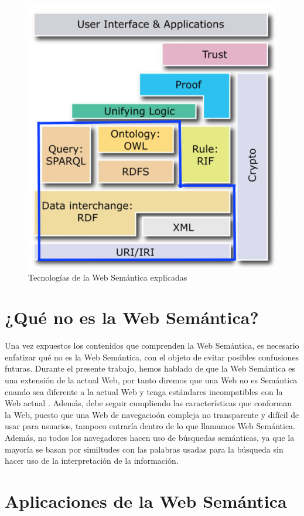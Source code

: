 \begin{figure}[H]
	\centering
	\includegraphics[width=0.48\linewidth]{imagenes/capitulo3/arquitectura2copia}
	\caption{Tecnologías de la Web Semántica explicadas}
	\label{fig:arquitectura2copia}
\end{figure}

\section{¿Qué no es la Web Semántica?}

Una vez expuestos los contenidos que comprenden la Web Semántica, es necesario enfatizar qué no es la Web Semántica, con el objeto de evitar posibles confusiones futuras. Durante el presente trabajo, hemos hablado de que la Web Semántica es una extensión de la actual Web, por tanto diremos que una Web no es Semántica cuando sea diferente a la actual Web y tenga estándares incompatibles con la Web actual \cite{introduccion}. Además, debe seguir cumpliendo las características que conforman la Web, puesto que una Web de navegacioón compleja no transparente y difícil de usar para usuarios, tampoco entraría dentro de lo que llamamos Web Semántica. Además, no todos los navegadores hacen uso de búsquedas semánticas, ya que la mayoría se basan por similtudes con las palabras usadas para la búsqueda sin hacer uso de la interpretación de la información.

\section{Aplicaciones de la Web Semántica}


